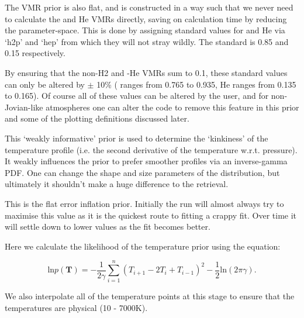 \documentclass[11pt, a4paper,titlepage]{report}
\begin{document}


The VMR prior is also flat, and is constructed in a way such that we never need to calculate the  and He VMRs directly, saving on calculation time by reducing the parameter-space. This is done by assigning standard values for  and He via `h2p' and `hep' from which they will not stray wildly. The standard is 0.85 and 0.15 respectively. 

By ensuring that the non-H2 and -He VMRs sum to 0.1, these standard values can only be altered by $\pm$ 10\% ( ranges from 0.765 to 0.935, He ranges from 0.135 to 0.165). Of course all of these values can be altered by the user, and for non-Jovian-like atmospheres one can alter the code to remove this feature in this prior and some of the plotting definitions discussed later.



This `weakly informative' prior is used to determine the `kinkiness' of the temperature profile (i.e. the second derivative of the temperature w.r.t. pressure). It weakly influences the prior to prefer smoother profiles via an inverse-gamma PDF. One can change the shape and size parameters of the distribution, but ultimately it shouldn't make a huge difference to the retrieval.



This is the flat error inflation prior. Initially the run will almost always try to maximise this value as it is the quickest route to fitting a crappy fit. Over time it will settle down to lower values as the fit becomes better.



Here we calculate the likelihood of the temperature prior using the equation:

\begin{equation}
\mathrm{ln} p(\bm{T}) = - \frac{1}{2 \gamma} \displaystyle\sum_{i=1}^{n} (T_{i+1} - 2T_i + T_{i-1})^2 - \frac{1}{2} \mathrm{ln}(2 \pi \gamma).
\end{equation}

We also interpolate all of the temperature points at this stage to ensure that the temperatures are physical (10 - 7000K). 
\end{document}
